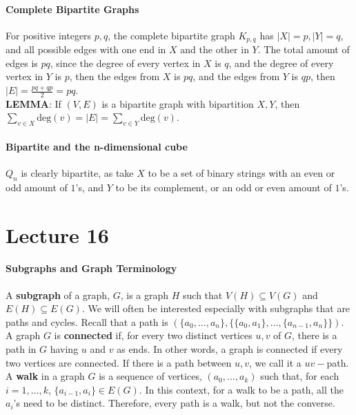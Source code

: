 \documentclass[10pt,letter]{article}
\begin{document}
\paragraph{Complete Bipartite Graphs}
For positive integers $p,q$, the complete bipartite graph $K_{p,q}$ has $|X|=p,|Y|=q$, and all possible edges with one end in $X$ and the other in $Y$. The total amount of edges is $pq$, since the degree of every vertex in $X$ is $q$, and the degree of every vertex in $Y$ is $p$, then the edges from $X$ is $pq$, and the edges from $Y$ is $qp$, then $|E|=\frac{pq+qp}{2}=pq$. \\ 
\textbf{LEMMA}: If $(V,E)$ is a bipartite graph with bipartition $X,Y$, then $\sum_{v\in X}\text{deg}(v)=|E|=\sum_{v\in Y}\text{deg}(v)$. 

\paragraph{Bipartite and the n-dimensional cube}
$Q_n$ is clearly bipartite, as take $X$ to be a set of binary strings with an even or odd amount of $1$'s, and $Y$ to be its complement, or an odd or even amount of $1$'s. 

\section*{Lecture 16}
\paragraph{Subgraphs and Graph Terminology}
A \textbf{subgraph} of a graph, $G$, is a graph $H$ such that $V(H)\subseteq V(G)$ and $E(H)\subseteq E(G)$. We will often be interested especially with subgraphs that are paths and cycles. Recall that a path is $(\{a_0,\ldots,a_n\},\{\{a_0,a_1\},\ldots,\{a_{n-1},a_{n}\}\})$. \\ 
A graph $G$ is \textbf{connected} if, for every two distinct vertices $u,v$ of $G$, there is a path in $G$ having $u$ and $v$ as ends. In other words, a graph is connected if every two vertices are connected. If there is a path between $u,v$, we call it a $uv-$path. \\ 
A \textbf{walk} in a graph $G$ is a sequence of vertices, $(a_0,\ldots,a_k)$ such that, for each $i=1,\ldots,k$, $\{a_{i-1},a_i\}\in E(G)$. In this context, for a walk to be a path, all the $a_i$'s need to be distinct. Therefore, every path is a walk, but not the converse. 
\end{document}

